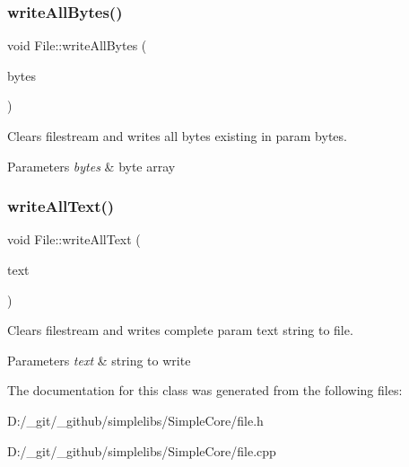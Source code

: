 \subsubsection{\texorpdfstring{writeAllBytes()}{writeAllBytes()}}
{\footnotesize\ttfamily void File\+::write\+All\+Bytes (\begin{DoxyParamCaption}\item[{const \mbox{\hyperlink{class_byte_array}{Byte\+Array}} \&}]{bytes }\end{DoxyParamCaption})}



Clears filestream and writes all bytes existing in param bytes. 


\begin{DoxyParams}{Parameters}
{\em bytes} & byte array \\
\hline
\end{DoxyParams}
\mbox{\label{class_file_a3d0bdb094fd754890130f27493792d05}} 
\subsubsection{\texorpdfstring{writeAllText()}{writeAllText()}}
{\footnotesize\ttfamily void File\+::write\+All\+Text (\begin{DoxyParamCaption}\item[{const \mbox{\hyperlink{class_a_string}{A\+String}} \&}]{text }\end{DoxyParamCaption})}



Clears filestream and writes complete param text string to file. 


\begin{DoxyParams}{Parameters}
{\em text} & string to write \\
\hline
\end{DoxyParams}


The documentation for this class was generated from the following files\+:\begin{DoxyCompactItemize}
\item 
D\+:/\+\_\+git/\+\_\+github/simplelibs/\+Simple\+Core/file.\+h\item 
D\+:/\+\_\+git/\+\_\+github/simplelibs/\+Simple\+Core/file.\+cpp\end{DoxyCompactItemize}
